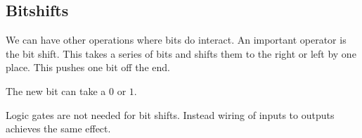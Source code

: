 
\subsection{Bitshifts}

We can have other operations where bits do interact. An important operator is the bit shift. This takes a series of bits and shifts them to the right or left by one place. This pushes one bit off the end. 

The new bit can take a \(0\) or \(1\).

Logic gates are not needed for bit shifts. Instead wiring of inputs to outputs achieves the same effect.

